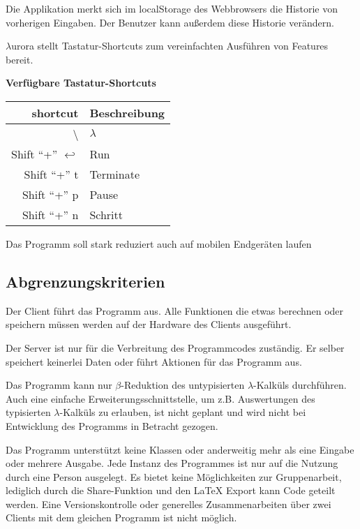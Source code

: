 \documentclass[parskip=full,11pt,twoside]{scrartcl}
\begin{document}
Die Applikation merkt sich im localStorage des Webbrowsers die Historie von vorherigen Eingaben. Der Benutzer kann außerdem diese Historie verändern.

$\lambda$urora stellt Tastatur-Shortcuts zum vereinfachten Ausführen von Features bereit.

\textbf{Verfügbare Tastatur-Shortcuts}

\label{shortcuts}
\begin{tabular}{|r|l|}

    \hline
    shortcut & Beschreibung \\ \hline
    \textbackslash & $\lambda$ \\ \hline
    Shift \enquote{+} $\hookleftarrow$ & Run \\ \hline
    Shift \enquote{+} t & Terminate \\ \hline
    Shift \enquote{+} p & Pause \\ \hline
    Shift \enquote{+} n & Schritt \\ \hline


\end{tabular}

Das Programm soll stark reduziert auch auf mobilen Endgeräten laufen

\subsection{Abgrenzungskriterien}

Der Client führt das Programm aus. Alle Funktionen die etwas berechnen oder speichern müssen werden auf der Hardware des Clients ausgeführt.

Der Server ist nur für die Verbreitung des Programmcodes zuständig. Er selber speichert keinerlei Daten oder führt Aktionen für das Programm aus.

Das Programm kann nur $\beta$-Reduktion des untypisierten $\lambda$-Kalküls durchführen. Auch eine einfache Erweiterungsschnittstelle, um z.B. Auswertungen des typisierten $\lambda$-Kalküls zu erlauben, ist nicht geplant und wird nicht bei Entwicklung des Programms in Betracht gezogen.

Das Programm unterstützt keine Klassen oder anderweitig mehr als eine Eingabe oder mehrere Ausgabe.
Jede Instanz des Programmes ist nur auf die Nutzung durch eine Person ausgelegt. Es bietet keine Möglichkeiten zur Gruppenarbeit, lediglich durch die Share-Funktion und den LaTeX Export kann Code geteilt werden.
\newline
Eine Versionskontrolle oder generelles Zusammenarbeiten über zwei Clients mit dem gleichen Programm ist nicht möglich.
\end{document}

